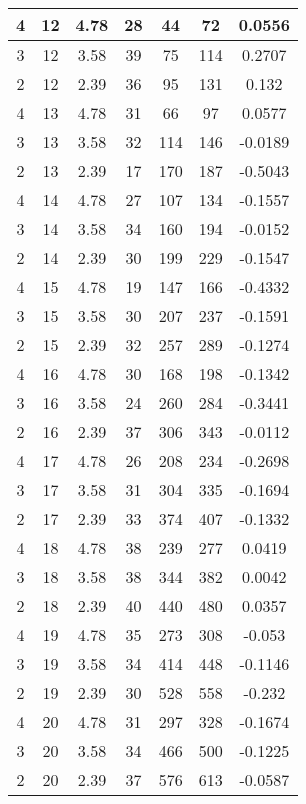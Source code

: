 \documentclass[letterpaper, 12pt]{article}
\begin{document}
\begin{longtable}{|c|c|c|c|c|c|c|}
\hline
4 & 12 & 4.78 & 28 & 44 & 72 & 0.0556 \\
\hline
3 & 12 & 3.58 & 39 & 75 & 114 & 0.2707 \\
\hline
2 & 12 & 2.39 & 36 & 95 & 131 & 0.132 \\
\hline
4 & 13 & 4.78 & 31 & 66 & 97 & 0.0577 \\
\hline
3 & 13 & 3.58 & 32 & 114 & 146 & -0.0189 \\
\hline
2 & 13 & 2.39 & 17 & 170 & 187 & -0.5043 \\
\hline
4 & 14 & 4.78 & 27 & 107 & 134 & -0.1557 \\
\hline
3 & 14 & 3.58 & 34 & 160 & 194 & -0.0152 \\
\hline
2 & 14 & 2.39 & 30 & 199 & 229 & -0.1547 \\
\hline
4 & 15 & 4.78 & 19 & 147 & 166 & -0.4332 \\
\hline
3 & 15 & 3.58 & 30 & 207 & 237 & -0.1591 \\
\hline
2 & 15 & 2.39 & 32 & 257 & 289 & -0.1274 \\
\hline
4 & 16 & 4.78 & 30 & 168 & 198 & -0.1342 \\
\hline
3 & 16 & 3.58 & 24 & 260 & 284 & -0.3441 \\
\hline
2 & 16 & 2.39 & 37 & 306 & 343 & -0.0112 \\
\hline
4 & 17 & 4.78 & 26 & 208 & 234 & -0.2698 \\
\hline
3 & 17 & 3.58 & 31 & 304 & 335 & -0.1694 \\
\hline
2 & 17 & 2.39 & 33 & 374 & 407 & -0.1332 \\
\hline
4 & 18 & 4.78 & 38 & 239 & 277 & 0.0419 \\
\hline
3 & 18 & 3.58 & 38 & 344 & 382 & 0.0042 \\
\hline
2 & 18 & 2.39 & 40 & 440 & 480 & 0.0357 \\
\hline
4 & 19 & 4.78 & 35 & 273 & 308 & -0.053 \\
\hline
3 & 19 & 3.58 & 34 & 414 & 448 & -0.1146 \\
\hline
2 & 19 & 2.39 & 30 & 528 & 558 & -0.232 \\
\hline
4 & 20 & 4.78 & 31 & 297 & 328 & -0.1674 \\
\hline
3 & 20 & 3.58 & 34 & 466 & 500 & -0.1225 \\
\hline
2 & 20 & 2.39 & 37 & 576 & 613 & -0.0587 \\
\hline
\end{longtable}
\end{document}
